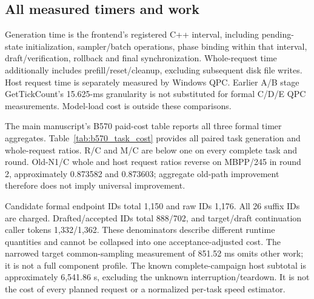 \subsection{All measured timers and work}
\label{supp:b570_costs}
Generation time is the frontend's registered C++ interval, including pending-state initialization, sampler/batch operations, phase binding within that interval, draft/verification, rollback and final synchronization. Whole-request time additionally includes prefill/reset/cleanup, excluding subsequent disk file writes. Host request time is separately measured by Windows QPC. Earlier A/B stage GetTickCount's 15.625-ms granularity is not substituted for formal C/D/E QPC measurements. Model-load cost is outside these comparisons.

The main manuscript's B570 paid-cost table reports all three formal timer aggregates. Table~\ref{tab:b570_task_cost} provides all paired task generation and whole-request ratios. R/C and M/C are below one on every complete task and round. Old-N1/C whole and host request ratios reverse on MBPP/245 in round 2, approximately 0.873582 and 0.873603; aggregate old-path improvement therefore does not imply universal improvement.



Candidate formal endpoint IDs total 1,150 and raw IDs 1,176. All 26 suffix IDs are charged. Drafted/accepted IDs total 888/702, and target/draft continuation caller tokens 1,332/1,362. These denominators describe different runtime quantities and cannot be collapsed into one acceptance-adjusted cost. The narrowed target common-sampling measurement of 851.52 ms omits other work; it is not a full component profile. The known complete-campaign host subtotal is approximately 6,541.86 s, excluding the unknown interruption/teardown. It is not the cost of every planned request or a normalized per-task speed estimator.
